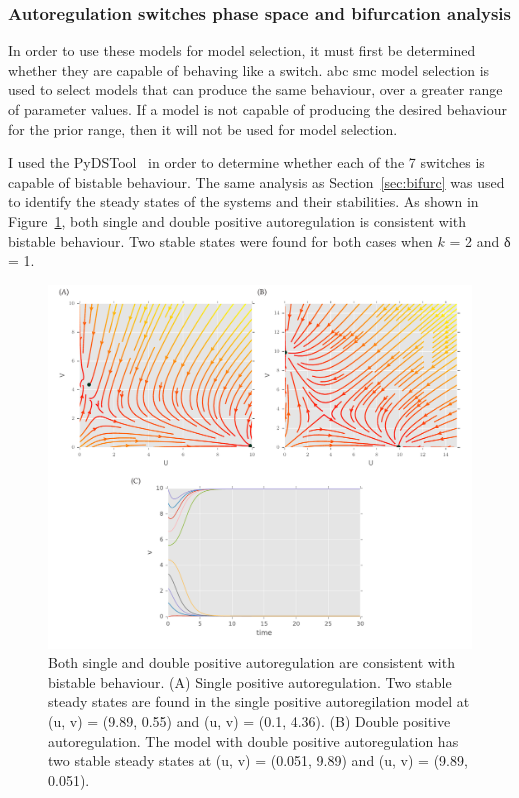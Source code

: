 \subsubsection{Autoregulation switches phase space and bifurcation analysis}
\label{sec:models_bist_bif}
In order to use these models for model selection, it must first be determined whether they are capable of behaving like a switch. \acrshort{abc} \acrshort{smc} model selection is used to select models that can produce the same behaviour, over a greater range of parameter values. If a model is not capable of producing the desired behaviour for the prior range, then it will not be used for model selection.

I used the PyDSTool~\autocite{Clewley:2012kj} in order to determine whether each of the 7 switches is capable of bistable behaviour. The same analysis as Section~\ref{sec:bifurc} was used to identify the steady states of the systems and their stabilities. As shown in Figure~\ref{fig:Gard_pos}, both single and double positive autoregulation is consistent with bistable behaviour. Two stable states were found for both cases when $k$ = 2 and δ = 1. 


\begin{figure}[htbp]
	\begin{center}
\includegraphics[scale=0.6]{../../chapters/chapterABCSysBio/images/gard_pos.pdf}
\caption[Phase plane analysis of the switches with positive autoregulation]{\label{fig:Gard_pos}Both single and double positive autoregulation are consistent with bistable behaviour.  (A) Single positive autoregulation. Two stable steady states are found in the single positive autoregilation model at (u, v) = (9.89, 0.55) and (u, v) = (0.1, 4.36). (B) Double positive autoregulation. The model with double positive autoregulation has two stable steady states at (u, v) = (0.051, 9.89) and (u, v) = (9.89, 0.051).}
\end{center}
\end{figure}


